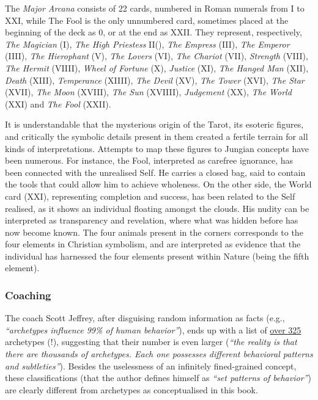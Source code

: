 \documentclass[
]{book}
\begin{document}
The \emph{Major Arcana} consists of 22 cards, numbered in Roman numerals from I to XXI, while The Fool is the only unnumbered card, sometimes placed at the beginning of the deck as 0, or at the end as XXII. They represent, respectively, \emph{The Magician} (I), \emph{The High Priestess} II(), \emph{The Empress} (III), \emph{The Emperor} (IIII), \emph{The Hierophant} (V), \emph{The Lovers} (VI), \emph{The Chariot} (VII), \emph{Strength} (VIII), \emph{The Hermit} (VIIII), \emph{Wheel of Fortune} (X), \emph{Justice} (XI), \emph{The Hanged Man} (XII), \emph{Death} (XIII), \emph{Temperance} (XIIII), \emph{The Devil} (XV), \emph{The Tower} (XVI), \emph{The Star} (XVII), \emph{The Moon} (XVIII), \emph{The Sun} (XVIIII), \emph{Judgement} (XX), \emph{The World} (XXI) and \emph{The Fool} (XXII).

It is understandable that the mysterious origin of the Tarot, its esoteric figures, and critically the symbolic details present in them created a fertile terrain for all kinds of interpretations. Attempts to map these figures to Jungian concepts have been numerous. For instance, the Fool, interpreted as carefree ignorance, has been connected with the unrealised Self. He carries a closed bag, said to contain the tools that could allow him to achieve wholeness. On the other side, the World card (XXI), representing completion and success, has been related to the Self realised, as it shows an individual floating amongst the clouds. His nudity can be interpreted as transparency and revelation, where what was hidden before has now become known. The four animals present in the corners corresponds to the four elements in Christian symbolism, and are interpreted as evidence that the individual has harnessed the four elements present within Nature (being the fifth element).

\hypertarget{coaching}{%
\subsubsection{Coaching}\label{coaching}}

The coach Scott Jeffrey, after disguising random information as facts (e.g., \emph{``archetypes influence 99\% of human behavior''}), ends up with a list of \href{https://scottjeffrey.com/archetypes-list/}{over 325} archetypes (!), suggesting that their number is even larger (\emph{``the reality is that there are thousands of archetypes. Each one possesses different behavioral patterns and subtleties''}). Besides the uselessness of an infinitely fined-grained concept, these classifications (that the author defines himself as \emph{``set patterns of behavior''}) are clearly different from archetypes as conceptualised in this book.
\end{document}
